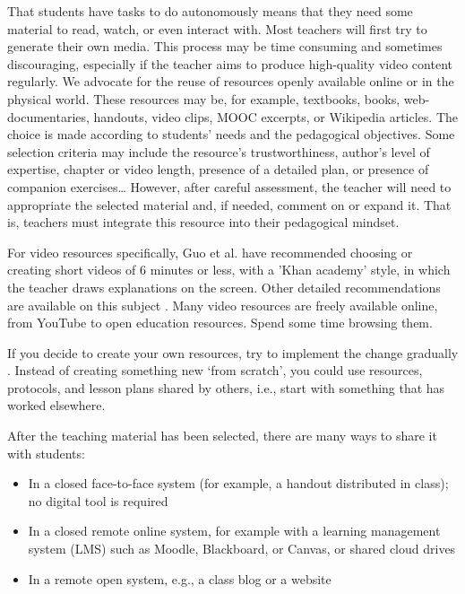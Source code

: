 \documentclass[10pt,letterpaper]{article}
\begin{document}
That students have tasks to do autonomously means that they need some material to read, watch, or even interact with. 
Most teachers will first try to generate their own media. This process may be time consuming and sometimes discouraging, 
especially if the teacher aims to produce high-quality video content regularly. We advocate for the reuse of resources 
openly available online or in the physical world. These resources may be, for example, textbooks, books, web-documentaries, handouts, video clips, 
MOOC excerpts, or Wikipedia articles. The choice is made according to students' needs and the pedagogical objectives. 
Some selection criteria may include the resource’s trustworthiness, author's level of expertise, chapter or video length, 
presence of a detailed plan, or presence of companion exercises\ldots{} However, after careful assessment, the teacher will 
need to appropriate the selected material and, if needed, comment on or expand it. That is, teachers must integrate this resource into their pedagogical mindset.

For video resources specifically, Guo et al. \cite{guo_how_2014} have recommended choosing or creating short videos of 6 minutes or less, 
with a 'Khan academy' style, in which the teacher draws explanations on the screen. Other detailed recommendations are available 
on this subject \cite{mayer_cambridge_2005}. Many video resources are freely available online, from YouTube to open education
resources. Spend some time browsing them.

If you decide to create your own resources, try to implement the change gradually \cite{lo_critical_2017}. 
Instead of creating something new ‘from scratch’, you could use resources, protocols, and lesson plans 
shared by others, i.e., start with something that has worked elsewhere.

After the teaching material has been selected, there are many ways to share it with students:

\begin{itemize}

\item In a closed face-to-face system (for example, a handout distributed in class); no digital tool is required

\item In a closed remote online system, for example with a learning management system (LMS) such as Moodle, Blackboard, or Canvas, 
or shared cloud drives

\item In a remote open system, e.g., a class blog or a website

\end{itemize}
\end{document}
